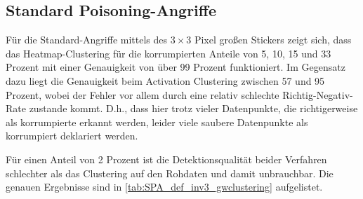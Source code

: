 \documentclass[11pt,a4paper]{article}
\numberwithin{equation}{section}
\begin{document}
	\subsection{Standard Poisoning-Angriffe}
	 Für die Standard-Angriffe mittels des $3 \times 3$ Pixel großen Stickers zeigt sich, dass das Heatmap-Clustering für die korrumpierten Anteile von 5, 10, 15 und 33 Prozent mit einer Genauigkeit von über 99 Prozent funktioniert. Im Gegensatz dazu liegt die Genauigkeit beim Activation Clustering zwischen 57 und 95 Prozent, wobei der Fehler vor allem durch eine relativ schlechte Richtig-Negativ-Rate zustande kommt. D.h., dass hier trotz vieler Datenpunkte, die richtigerweise als korrumpierte erkannt werden, leider viele saubere Datenpunkte als korrumpiert deklariert werden.
	 
	 Für einen Anteil von 2 Prozent ist die Detektionsqualität beider Verfahren schlechter als das Clustering auf den Rohdaten und damit unbrauchbar. Die genauen Ergebnisse sind in \autoref{tab:SPA_def_inv3_gwclustering} aufgelistet.
	 \begin{table}[ht]
	 	\begin{center}
	 		\caption[Vergleich von Angriffen und Verteidigungen für SPA]{Qualität der Detektion unterschiedlich starker Angriffe mithilfe von LRP-Clustering und Gromov-Wasserstein-Distanzen. Die Seitenlänge des Stickers beträgt $s=3$.}
	 		
	 		\label{tab:SPA_def_inv3_gwclustering}	
	 	\end{center}
	 \end{table}
 
\end{document}
